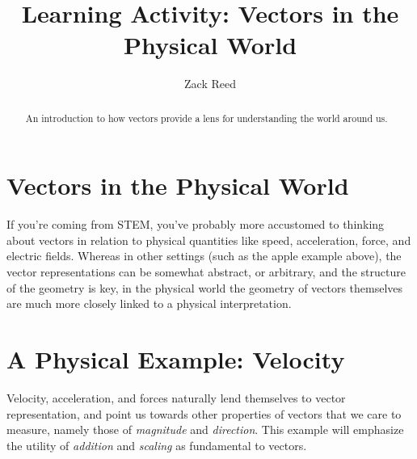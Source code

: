 \documentclass{ximera}
\author{Zack Reed}
\title{Learning Activity: Vectors in the Physical World}
\begin{document}
\begin{abstract}
    An introduction to how vectors provide a lens for understanding the world around us.
\end{abstract}
\maketitle

\section*{Vectors in the Physical World}

If you're coming from STEM, you've probably more accustomed to thinking about vectors in relation to physical quantities like speed, acceleration, force, and electric fields. Whereas in other settings (such as the apple example above), the vector representations can be somewhat abstract, or arbitrary, and the structure of the geometry is key, in the physical world the geometry of vectors themselves are much more closely linked to a physical interpretation.

\section*{A Physical Example: Velocity}

Velocity, acceleration, and forces naturally lend themselves to vector representation, and point us towards other properties of vectors that we care to measure, namely those of \textit{magnitude} and \textit{direction}. This example will emphasize the utility of \textit{addition} and \textit{scaling} as fundamental to vectors.
\end{document}
